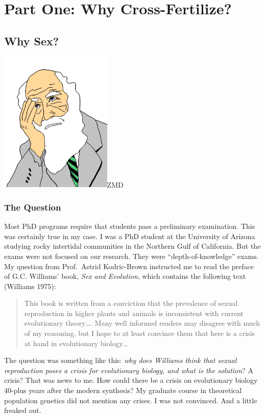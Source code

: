 \documentclass[
  letterpaper,
]{scrbook}
\begin{document}
\part{Part One: Why Cross-Fertilize?}

\hypertarget{sec-why-sex}{%
\chapter{Why Sex?}\label{sec-why-sex}}

\includegraphics[width=0.4\textwidth,height=\textheight]{images/Picture1.jpg}ZMD

\hypertarget{the-question}{%
\section{The Question}\label{the-question}}

Most PhD programs require that students pass a preliminary examination.
This was certainly true in my case. I was a PhD student at the
University of Arizona studying rocky intertidal communities in the
Northern Gulf of California. But the exams were not focused on our
research. They were ``depth-of-knowledge'' exams. My question from
Prof.~Astrid Kodric-Brown instructed me to read the preface of G.C.
Williams' book, \emph{Sex and Evolution}, which contains the following
text (Williams 1975):

\begin{quote}
This book is written from a conviction that the prevalence of sexual
reproduction in higher plants and animals is inconsistent with current
evolutionary theory\ldots. Many well informed readers may disagree with
much of my reasoning, but I hope to at least convince them that here is
a crisis at hand in evolutionary biology\ldots{}
\end{quote}

The question was something like this: \emph{why does Williams think that
sexual reproduction poses a crisis for evolutionary biology, and what is
the solution}? A crisis? That was news to me. How could there be a
crisis on evolutionary biology 40-plus years after the modern synthesis?
My graduate course in theoretical population genetics did not mention
any crises. I was not convinced. And a little freaked out.
\end{document}
